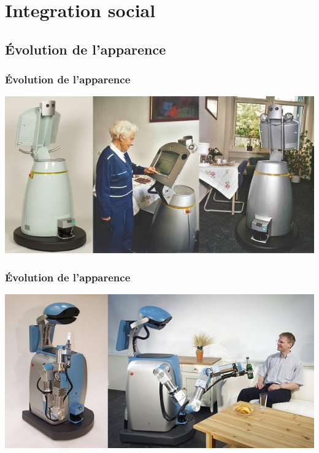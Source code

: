 \section{Integration social}
\subsection{\'Evolution de l'apparence}
\begin{frame}
  \frametitle{\'Evolution de l'apparence}
    \begin{center}
    \includegraphics[scale = 0.4]{image/Care_O_bot_1-title.jpg}
    \end{center}
\end{frame}
    
\begin{frame}
  \frametitle{\'Evolution de l'apparence}
  \begin{center}
  \includegraphics[scale = 0.4]{image/Care-O-bot_II-title.jpg}
  \end{center}
\end{frame}

